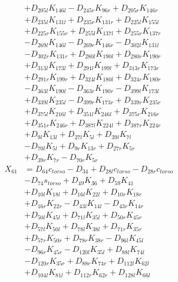 \begin{multicols}{2}
\begin{align}
&+ D_{205l}K_{146l} - D_{245r}K_{96r} + D_{205r}K_{146r}  \nonumber \\
&+ D_{235l}K_{131l} + D_{235r}K_{131r} + D_{225l}K_{155l}  \nonumber \\
&+ D_{225r}K_{155r} + D_{255l}K_{137l} + D_{255r}K_{137r}  \nonumber \\
&- D_{269l}K_{146l} - D_{269r}K_{146r} - D_{302l}K_{131l}  \nonumber \\
&- D_{302r}K_{131r} + D_{280l}K_{190l} + D_{280r}K_{190r}  \nonumber \\
&+ D_{313l}K_{173l} + D_{291l}K_{199l} + D_{313r}K_{173r}  \nonumber \\
&+ D_{291r}K_{199r} + D_{324l}K_{180l} + D_{324r}K_{180r}  \nonumber \\
&- D_{363l}K_{190l} - D_{363r}K_{190r} - D_{399l}K_{173l}  \nonumber \\
&+ D_{339l}K_{235l} - D_{399r}K_{173r} + D_{339r}K_{235r}  \nonumber \\
&+ D_{375l}K_{216l} + D_{351l}K_{246l} + D_{375r}K_{216r}  \nonumber \\
&+ D_{351r}K_{246r} + D_{387l}K_{224l} + D_{387r}K_{224r}  \nonumber \\
&+ D_{9l}K_{13l} + D_{27l}K_{5l} + D_{39l}K_{7l}  \nonumber \\
&- D_{70l}K_{5l} + D_{9r}K_{13r} + D_{27r}K_{5r}  \nonumber \\
&+ D_{39r}K_{7r} - D_{70r}K_{5r} \nonumber \\
X_{61} &= D_{64}c_{torso} - D_{34} + D_{28l}c_{torso} - D_{28r}c_{torso}  \nonumber \\
&- D_{74}s_{torso} + D_{49}K_{36} + D_{59}K_{41}  \nonumber \\
&+ D_{10l}K_{18l} + D_{16l}K_{22l} + D_{10r}K_{18r}  \nonumber \\
&+ D_{16r}K_{22r} - D_{43l}K_{14l} - D_{43r}K_{14r}  \nonumber \\
&+ D_{50l}K_{45l} + D_{71l}K_{35l} + D_{50r}K_{45r}  \nonumber \\
&+ D_{57l}K_{50l} + D_{78l}K_{38l} + D_{71r}K_{35r}  \nonumber \\
&+ D_{57r}K_{50r} + D_{78r}K_{38r} - D_{96l}K_{45l}  \nonumber \\
&- D_{96r}K_{45r} - D_{120l}K_{35l} + D_{88l}K_{74l}  \nonumber \\
&- D_{120r}K_{35r} + D_{88r}K_{74r} + D_{112l}K_{62l}  \nonumber \\
&+ D_{104l}K_{81l} + D_{112r}K_{62r} + D_{128l}K_{66l}  \nonumber \\

\end{align}
\end{multicols}
